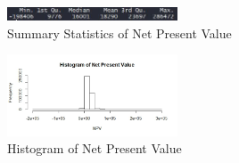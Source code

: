 \documentclass[10pt,twocolumn,letterpaper]{article}
\begin{document}
\begin{figure}
	\includegraphics[width=0.45\textwidth]{images/NPVS.JPG}
	\caption{Summary Statistics of Net Present Value}
	\label{fig:NPVS}
\end{figure}
\begin{figure}
	\includegraphics[width=0.45\textwidth]{images/NPVB.jpeg}
	\caption{Histogram of Net Present Value}
	\label{fig:NPVB}
\end{figure}
\end{document}
